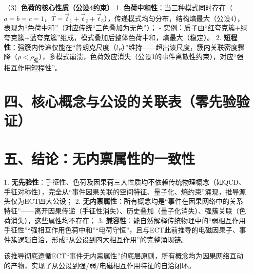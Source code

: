 \documentclass{article}
\begin{document}
（3）\textbf{色荷的核心性质（公设4约束）}  
1. \textbf{色荷中和性}：当三种模式同时存在（\(a=b=c=1\)，\(\vec{T} = \vec{t}_1+\vec{t}_2+\vec{t}_3\)），传递模式均匀分布，结构熵最大（公设4），表现为“色荷中和”（对应传统“三色叠加为无色”）；  
   - 实例：质子由“红夸克簇+绿夸克簇+蓝夸克簇”组成，模式叠加后整体色荷中和，熵最大（稳定）。  
2. \textbf{短程性}：强簇内传递仅能在“普朗克尺度（\(l_P\)）”维持——超出该尺度，簇内关联密度骤降（\(\rho < \rho_{\text{强}}\)），多模式崩溃，色荷效应消失（公设1的事件离散性约束），对应“强相互作用短程性”。


\section*{四、核心概念与公设的关联表（零先验验证）}
\begin{table}[h!]
\centering
{}
\end{table}


\section*{五、结论：无内禀属性的一致性}
1. \textbf{无先验性}：手征性、色荷及因果荷三大性质均不依赖传统物理概念（如QCD、手征对称性），完全从“事件因果关联的空间特征、量子化、熵约束”涌现，推导源头仅为ECT四大公设；  
2. \textbf{无内禀属性}：所有概念均是“事件在因果网络中的关系特征”——离开因果传递（手征性消失）、历史叠加（量子化消失）、强簇关联（色荷消失），这些属性均不存在；  
3. \textbf{兼容性}：能自然解释传统物理中的“弱相互作用手征性”“强相互作用色荷中和”“电荷守恒”，且与ECT此前推导的电磁因果子、事件簇逻辑自洽，形成“从公设到四大相互作用”的完整涌现链。

该推导彻底遵循ECT“事件无内禀属性”的底层原则，所有概念均为因果网络互动的产物，实现了从公设到强/弱/电磁相互作用特征的自洽闭环。
\end{document}
